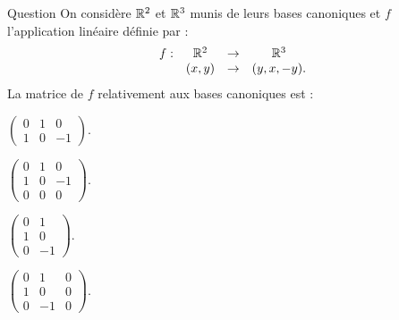 \begin{multi}[multiple,feedback=
{Soit \({\cal {B}}=\{e_1,e_2\}\)  et \({\cal {B}}'=\{e_1',e_2',e_3'\}\) les bases canoniques de  \(\Rr^2\) et  \(\Rr^3\) respectivement. La matrice de \(f\)  relativement à ces bases est la matrice dont la \(1\)ère colonne \(f(e_1)=\left(\begin{array}{r}
0\\1\\0\\\end{array}\right)\) et la 2ème colonne est \(f(e_2)=\left(\begin{array}{r}1\\0\\-1\\
\end{array}\right)\). Cette matrice est : 
\(\left(\begin{array}{rc}0&1\\
1&0\\0&-1\end{array}\right).\)
}]{Question}
On considère \(\Rr^2\) et \(\Rr^3\) munis de leurs bases canoniques et \(f\) l'application linéaire définie par :
\[\begin{array}{rccc}f:&\mathbb{R}^2 &\to& \mathbb{R}^3\\
& (x,y)&\to &(y,x,-y).  \end{array}\]
La matrice de \(f\) relativement aux bases canoniques est :

    \item \(\left(\begin{array}{rcc}
0&1&0\\
1&0&-1\end{array}\right)\).
    \item \(\left(\begin{array}{rcc}
0&1&0\\
1&0&-1\\
0&0&0\end{array}\right)\).
    \item* \(\left(\begin{array}{rc}
0&1\\1&0\\0&-1\end{array}\right)\).
    \item \(\left(\begin{array}{rcc}
0&1&0\\
1&0&0\\0&-1&0\end{array}\right)\).
\end{multi}


